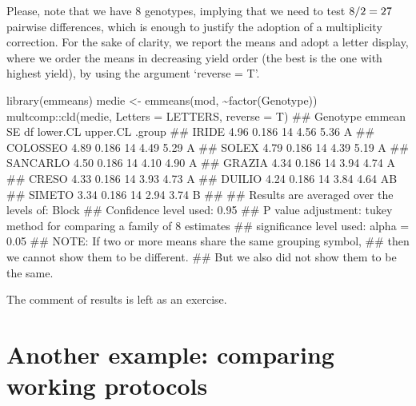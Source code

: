 \documentclass[a4paper,12pt,oneside]{book}
\newenvironment{Shaded}{\begin{snugshade}}{\end{snugshade}}
\newcommand{\SpecialCharTok}[1]{#1}
\newcommand{\DocumentationTok}[1]{#1}
\newcommand{\OtherTok}[1]{#1}
\newcommand{\FunctionTok}[1]{#1}
\newcommand{\AttributeTok}[1]{#1}
\newcommand{\AlertTok}[1]{#1}
\newcommand{\NormalTok}[1]{#1}
\begin{document}
Please, note that we have 8 genotypes, implying that we need to test \(8 \time 7 / 2 = 27\) pairwise differences, which is enough to justify the adoption of a multiplicity correction. For the sake of clarity, we report the means and adopt a letter display, where we order the means in decreasing yield order (the best is the one with highest yield), by using the argument `reverse = T'.

\scriptsize

\begin{Shaded}
\begin{Highlighting}[]
\FunctionTok{library}\NormalTok{(emmeans)}
\NormalTok{medie }\OtherTok{\textless{}{-}} \FunctionTok{emmeans}\NormalTok{(mod, }\SpecialCharTok{\textasciitilde{}}\FunctionTok{factor}\NormalTok{(Genotype))}
\NormalTok{multcomp}\SpecialCharTok{::}\FunctionTok{cld}\NormalTok{(medie, }\AttributeTok{Letters =}\NormalTok{ LETTERS, }\AttributeTok{reverse =}\NormalTok{ T)}
\DocumentationTok{\#\#  Genotype emmean    SE df lower.CL upper.CL .group}
\DocumentationTok{\#\#  IRIDE      4.96 0.186 14     4.56     5.36  A    }
\DocumentationTok{\#\#  COLOSSEO   4.89 0.186 14     4.49     5.29  A    }
\DocumentationTok{\#\#  SOLEX      4.79 0.186 14     4.39     5.19  A    }
\DocumentationTok{\#\#  SANCARLO   4.50 0.186 14     4.10     4.90  A    }
\DocumentationTok{\#\#  GRAZIA     4.34 0.186 14     3.94     4.74  A    }
\DocumentationTok{\#\#  CRESO      4.33 0.186 14     3.93     4.73  A    }
\DocumentationTok{\#\#  DUILIO     4.24 0.186 14     3.84     4.64  AB   }
\DocumentationTok{\#\#  SIMETO     3.34 0.186 14     2.94     3.74   B   }
\DocumentationTok{\#\# }
\DocumentationTok{\#\# Results are averaged over the levels of: Block }
\DocumentationTok{\#\# Confidence level used: 0.95 }
\DocumentationTok{\#\# P value adjustment: tukey method for comparing a family of 8 estimates }
\DocumentationTok{\#\# significance level used: alpha = 0.05 }
\DocumentationTok{\#\# }\AlertTok{NOTE}\DocumentationTok{: If two or more means share the same grouping symbol,}
\DocumentationTok{\#\#       then we cannot show them to be different.}
\DocumentationTok{\#\#       But we also did not show them to be the same.}
\end{Highlighting}
\end{Shaded}

\normalsize

The comment of results is left as an exercise.

\hypertarget{another-example-comparing-working-protocols}{%
\section{Another example: comparing working protocols}\label{another-example-comparing-working-protocols}}
\end{document}
